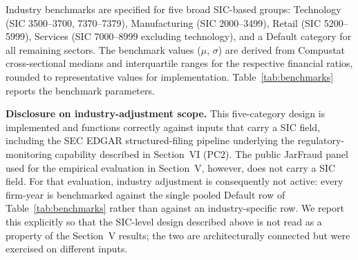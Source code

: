 \documentclass[12pt]{article}
\begin{document}
Industry benchmarks are specified for five broad SIC-based groups:
Technology (SIC 3500--3700, 7370--7379), Manufacturing (SIC 2000--3499),
Retail (SIC 5200--5999), Services (SIC 7000--8999 excluding technology),
and a Default category for all remaining sectors.
The benchmark values ($\mu$, $\sigma$) are derived from Compustat
cross-sectional medians and interquartile ranges for the respective
financial ratios, rounded to representative values for implementation.
Table~\ref{tab:benchmarks} reports the benchmark parameters.

\textbf{Disclosure on industry-adjustment scope.} This five-category
design is implemented and functions correctly against inputs that carry
a SIC field, including the SEC EDGAR structured-filing pipeline
underlying the regulatory-monitoring capability described in Section~VI
(PC2).  The public JarFraud panel used for the empirical evaluation in
Section~V, however, does not carry a SIC field.  For that evaluation,
industry adjustment is consequently not active: every firm-year is
benchmarked against the single pooled Default row of
Table~\ref{tab:benchmarks} rather than against an industry-specific row.
We report this explicitly so that the SIC-level design described above
is not read as a property of the Section~V results; the two are
architecturally connected but were exercised on different inputs.
\end{document}
